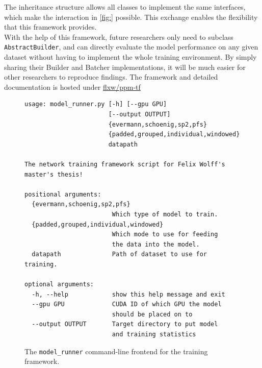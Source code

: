 The inheritance structure allows all classes to implement the same interfaces, which make the interaction in \autoref{fig:} possible. This exchange enables the flexibility that this framework provides.\\

With the help of this framework, future researchers only need to subclass \verb=AbstractBuilder=, and can directly evaluate the model performance on any given dataset without having to implement the whole training environment. By simply sharing their Builder and Batcher implementations, it will be much easier for other researchers to reproduce findings. The framework and detailed documentation is hosted under \href{https://github.com/flxw/ppm-tf}{flxw/ppm-tf}

\begin{figure}
\centering
\begin{verbatim}
usage: model_runner.py [-h] [--gpu GPU]
                       [--output OUTPUT]
                       {evermann,schoenig,sp2,pfs}
                       {padded,grouped,individual,windowed}
                       datapath

The network training framework script for Felix Wolff's master's thesis!

positional arguments:
  {evermann,schoenig,sp2,pfs}
                        Which type of model to train.
  {padded,grouped,individual,windowed}
                        Which mode to use for feeding
                        the data into the model.
  datapath              Path of dataset to use for training.

optional arguments:
  -h, --help            show this help message and exit
  --gpu GPU             CUDA ID of which GPU the model
                        should be placed on to
  --output OUTPUT       Target directory to put model
                        and training statistics
\end{verbatim}
\caption{The \texttt{model\_runner} command-line frontend for the training framework.}
\label{fig:framework-frontend}
\end{figure}
